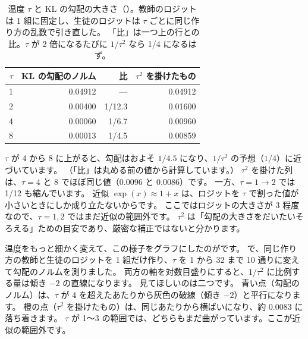 \begin{table}[tbp]
\centering
\caption{温度 $\tau$ と KL の勾配の大きさ（）。教師のロジットは 1 組に固定し、生徒のロジットは $\tau$ ごとに同じ作り方の乱数で引き直した。
「比」は一つ上の行との比。$\tau$ が 2 倍になるたびに $1/\tau^2$ なら 1/4 になるはず。}
\label{tab:distill-tau-grad}
\begin{tabular}{rrrr}
\toprule
$\tau$ & KL の勾配のノルム & 比 & $\tau^2$ を掛けたもの \\
\midrule
1 & 0.04912 & — & 0.04912 \\
2 & 0.00400 & 1/12.3 & 0.01600 \\
4 & 0.00060 & 1/6.7 & 0.00960 \\
8 & 0.00013 & 1/4.5 & 0.00859 \\
\bottomrule
\end{tabular}
\end{table}

$\tau$ が 4 から 8 に上がると、勾配はおよそ $1/4.5$ になり、$1/\tau^2$ の予想（$1/4$）に近づいています。
（「比」は丸める前の値から計算しています。）
$\tau^2$ を掛けた列は、$\tau=4$ と $8$ でほぼ同じ値（0.0096 と 0.0086）です。
一方、$\tau=1\to2$ では 1/12 も縮んでいます。
近似 $\exp(x)\approx1+x$ は、ロジットを $\tau$ で割った値が小さいときにしか成り立たないからです。
ここではロジットの大きさが 3 程度なので、$\tau=1, 2$ ではまだ近似の範囲外です。
$\tau^2$ は「勾配の大きさをだいたいそろえる」ための目安であり、厳密な補正ではないと分かります。

温度をもっと細かく変えて、この様子をグラフにしたのがです。
 で、同じ作り方の教師と生徒のロジットを 1 組だけ作り、$\tau$ を 1 から 32 まで 10 通りに変えて勾配のノルムを測りました。
両方の軸を対数目盛りにすると、$1/\tau^2$ に比例する量は傾き $-2$ の直線になります。
見てほしいのは二つです。
青い点（勾配のノルム）は、$\tau$ が 4 を超えたあたりから灰色の破線（傾き $-2$）と平行になります。
橙の点（$\tau^2$ を掛けたもの）は、同じあたりから横ばいになり、約 0.0083 に落ち着きます。
$\tau$ が 1〜3 の範囲では、どちらもまだ曲がっています。ここが近似の範囲外です。

